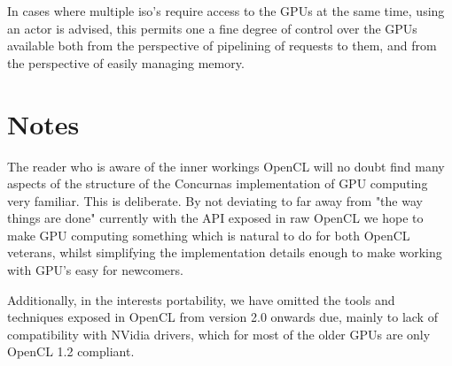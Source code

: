 \documentclass[conc-doc]{subfiles}
\begin{document}
In cases where multiple iso's require access to the GPUs at the same time, using an actor is advised, this permits one a fine degree of control over the GPUs available both from the perspective of pipelining of requests to them, and from the perspective of easily managing memory.

\section{Notes}
The reader who is aware of the inner workings OpenCL will no doubt find many aspects of the structure of the Concurnas implementation of GPU computing very familiar. This is deliberate. By not deviating to far away from "the way things are done" currently with the API exposed in raw OpenCL we hope to make GPU computing something which is natural to do for both OpenCL veterans, whilst simplifying the implementation details enough to make working with GPU's easy for newcomers.

Additionally, in the interests portability, we have omitted the tools and techniques exposed in OpenCL from version 2.0 onwards due, mainly to lack of compatibility with NVidia drivers, which for most of the older GPUs are only OpenCL 1.2 compliant.
\end{document}

